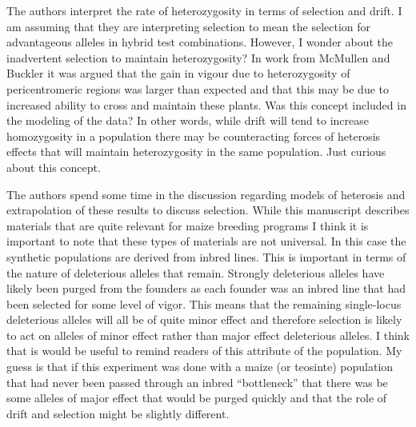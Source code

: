 \documentclass[onecolumn,oneside,letterpaper]{article}
\begin{document}

The authors interpret the rate of heterozygosity in terms of selection and drift.  I am assuming that they are interpreting selection to mean the selection for advantageous alleles in hybrid test combinations.  However, I wonder about the inadvertent selection to maintain heterozygosity?  In work from McMullen and Buckler it was argued that the gain in vigour due to heterozygosity of pericentromeric regions was larger than expected and that this may be due to increased ability to cross and maintain these plants.  Was this concept included in the modeling of the data?  In other words, while drift will tend to increase homozygosity in a population there may be counteracting forces of heterosis effects that will maintain heterozygosity in the same population.  Just curious about this concept.


The authors spend some time in the discussion regarding models of heterosis and 
extrapolation of these results to discuss selection.  While this manuscript 
describes materials that are quite relevant for maize breeding programs I think 
it is important to note that these types of materials are not universal.  In 
this case the synthetic populations are derived from inbred lines.  This is 
important in terms of the nature of deleterious alleles that remain.  Strongly 
deleterious alleles have likely been purged from the founders as each founder 
was an inbred line that had been selected for some level of vigor.  This means 
that the remaining single-locus deleterious alleles will all be of quite minor 
effect and therefore selection is likely to act on alleles of minor effect 
rather than major effect deleterious alleles.  I think that is would be useful 
to remind readers of this attribute of the population.  My guess is that if this 
experiment was done with a maize (or teosinte) population that had never been 
passed through an inbred ``bottleneck'' that there was be some alleles of major 
effect that would be purged quickly and that the role of drift and selection 
might be slightly different.
\end{document}
